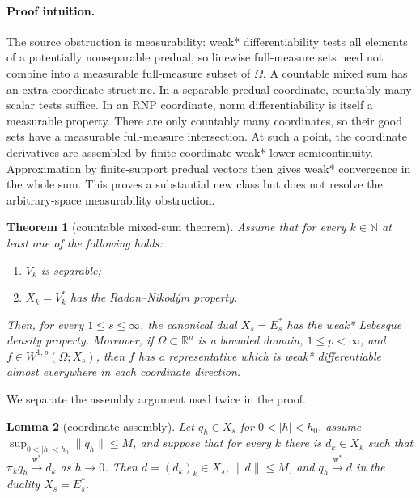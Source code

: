 \documentclass[11pt]{article}
\newtheorem{theorem}{Theorem}
\newtheorem{lemma}[theorem]{Lemma}
\theoremstyle{remark}
\newcommand{\R}{\mathbb{R}}
\newcommand{\N}{\mathbb{N}}
\newcommand{\wstar}{\mathrm{w}^*}
\newcommand{\weakstar}{\mathop{\longrightarrow}\limits^{\wstar}}
\begin{document}
\paragraph{Proof intuition.}
The source obstruction is measurability: weak* differentiability tests all
elements of a potentially nonseparable predual, so linewise full-measure sets
need not combine into a measurable full-measure subset of $\Omega$.  A
countable mixed sum has an extra coordinate structure.  In a
separable-predual coordinate, countably many scalar tests suffice.  In an RNP
coordinate, norm differentiability is itself a measurable property.  There
are only countably many coordinates, so their good sets have a measurable
full-measure intersection.  At such a point, the coordinate derivatives are
assembled by finite-coordinate weak* lower semicontinuity.  Approximation by
finite-support predual vectors then gives weak* convergence in the whole sum.
This proves a substantial new class but does not resolve the arbitrary-space
measurability obstruction.

\begin{theorem}[countable mixed-sum theorem]\label{thm:main}
Assume that for every $k\in\N$ at least one of the following holds:
\begin{enumerate}
 \item $V_k$ is separable;
 \item $X_k=V_k^*$ has the Radon--Nikod\'ym property.
\end{enumerate}
Then, for every $1\le s\le\infty$, the canonical dual $X_s=E_s^*$ has the
weak* Lebesgue density property.  Moreover, if $\Omega\subset\R^n$ is a
bounded domain, $1\le p<\infty$, and
$f\in W^{1,p}(\Omega;X_s)$, then $f$ has a representative which is weak*
differentiable almost everywhere in each coordinate direction.
\end{theorem}

We separate the assembly argument used twice in the proof.

\begin{lemma}[coordinate assembly]\label{lem:assembly}
Let $q_h\in X_s$ for $0<|h|<h_0$, assume
$\sup_{0<|h|<h_0}\|q_h\|\le M$, and suppose that for every $k$ there is
$d_k\in X_k$ such that $\pi_kq_h\weakstar d_k$ as $h\to0$.  Then
$d=(d_k)_k\in X_s$, $\|d\|\le M$, and $q_h\weakstar d$ in the duality
$X_s=E_s^*$.
\end{lemma}
\end{document}
